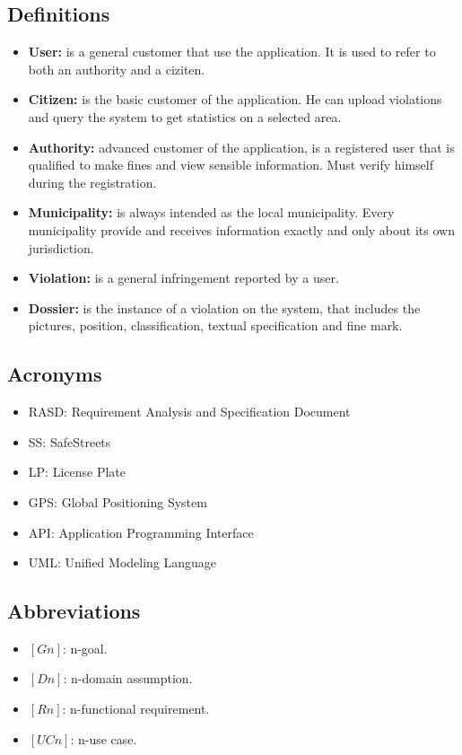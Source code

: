 \documentclass[../RASD.tex]{subfiles}
\begin{document}
        \subsection{Definitions}\label{subsec:definitions}
        \begin{itemize}
            \item \textbf{User:} is a general customer that use the application. It is used to refer to both an authority and a ciziten.
            \item \textbf{Citizen:} is the basic customer of the application. He can upload violations and query the system to get statistics on a selected area.
            \item \textbf{Authority:} advanced customer of the application, is a registered user that is qualified to make fines and view sensible information. Must verify himself during the registration.
            \item \textbf{Municipality:} is always intended as the local municipality. Every municipality provide and receives information exactly and only about its own jurisdiction.
            \item \textbf{Violation:} is a general infringement reported by a user.
            \item  \textbf{Dossier:} is the instance of a violation on the system, that includes the pictures, position, classification, textual specification and fine mark.
        \end{itemize}

        \subsection{Acronyms}\label{subsec:acronyms}
        \begin{itemize}
            \item RASD: Requirement Analysis and Specification Document
            \item SS: SafeStreets
            \item LP: License Plate
            \item GPS: Global Positioning System
            \item API: Application Programming Interface
            \item UML: Unified Modeling Language
        \end{itemize}

        \subsection{Abbreviations}\label{subsec:abbreviations}
        \begin{itemize}
            \item $[Gn]$: n-goal.
            \item $[Dn]$: n-domain assumption.
            \item $[Rn]$: n-functional requirement.
            \item $[UCn]$: n-use case.
        \end{itemize}
\end{document}
